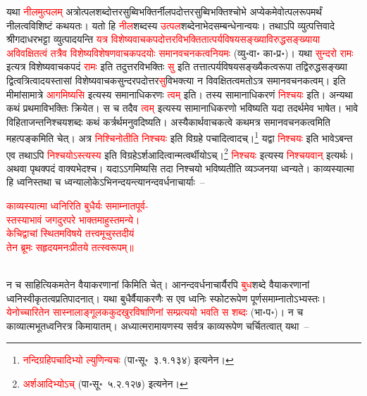 \begin{sloppypar}
यथा \textcolor{red}{नीलमुत्पलम्} अत्रोत्पल\-शब्दोत्तर\-सुब्विभक्तिर्नील\-पदोत्तर\-सुब्विभक्तिश्चोभे अप्येकमेवोत्पल\-रूपमर्थं नीलत्व\-विशिष्टं कथयतः। यतो हि \textcolor{red}{नील}\-शब्दस्य \textcolor{red}{उत्पल}\-शब्देनाभेद\-सम्बन्धेनान्वयः। तथाऽपि व्युत्पत्तिवादे श्रीगदाधरभट्टा व्युत्पादयन्ति \textcolor{red}{यत्र विशेष्य\-वाचक\-पदोत्तर\-विभक्ति\-तात्पर्य\-विषय\-सङ्ख्या\-विरुद्ध\-सङ्ख्याया अविवक्षितत्वं तत्रैव विशेष्य\-विशेषण\-वाचक\-पदयोः समान\-वचनकत्व\-नियमः} (व्यु॰वा॰ का॰प्र॰)। यथा \textcolor{red}{सुन्दरो रामः} इत्यत्र विशेष्य\-वाचक\-पदं \textcolor{red}{रामः} इति तदुत्तर\-विभक्तिः \textcolor{red}{सु} इति तत्तात्पर्य\-विषय\-सङ्ख्यैकत्व\-रूपा तद्विरुद्ध\-सङ्ख्या द्वित्व\-त्रित्वादयस्तासां विशेष्य\-वाचक\-सुन्दर\-पदोत्तर\-\textcolor{red}{सु}\-विभक्त्या न विवक्षितत्वमतोऽत्र समान\-वचनकत्वम्। इति मीमांसा\-मात्रे \textcolor{red}{आगमिष्यसि} इत्यस्य समानाधिकरणः \textcolor{red}{त्वम्} इति। तस्य सामानाधिकरणं \textcolor{red}{निश्चयः} इति। अन्यथा कथं प्रथमा\-विभक्तिः क्रियेत। स च तदैव \textcolor{red}{त्वम्} इत्यस्य सामानाधिकरणो भविष्यति यदा तदर्थमेव भाषेत। भावे विहिताजन्त\-निश्चय\-शब्दः कथं कर्त्रर्थमनुवदिष्यति। अस्यैकार्थ\-वाचकत्वे कथमत्र समान\-वचनकत्वमिति महत्पङ्कमिति चेत्। अत्र \textcolor{red}{निश्चिनोतीति निश्चयः} इति विग्रहे पचादित्वादच्।\footnote{\textcolor{red}{नन्दि\-ग्रहि\-पचादिभ्यो ल्युणिन्यचः} (पा॰सू॰~३.१.१३४) इत्यनेन।} यद्वा \textcolor{red}{निश्चयः} इति भावेऽबन्त एव तथाऽपि \textcolor{red}{निश्चयोऽस्त्यस्य} इति विग्रहेऽर्श\-आदित्वान्मत्वर्थीयोऽच्।\footnote{\textcolor{red}{अर्शआदिभ्योऽच्} (पा॰सू॰~५.२.१२७) इत्यनेन।} \textcolor{red}{निश्चयः} इत्यस्य \textcolor{red}{निश्चयवान्} इत्यर्थः। अथवा पृथक्पदं वाक्यभेदश्च। यदाऽऽगमिष्यसि तदा निश्चयो भविष्यतीति व्यञ्जनया ध्वन्यते। काव्यस्यात्मा हि ध्वनिस्तथा च ध्वन्यालोकेऽभिनन्दयन्त्यानन्द\-वर्धनाचार्याः~–\end{sloppypar}
\centering\textcolor{red}{काव्यस्यात्मा ध्वनिरिति बुधैर्यः समाम्नातपूर्व-\nopagebreak\\
स्तस्याभावं जगदुरपरे भाक्तमाहुस्तमन्ये।\nopagebreak\\
केचिद्वाचां स्थितमविषये तत्त्वमूचुस्तदीयं\nopagebreak\\
तेन ब्रूमः सहृदयमनःप्रीतये तत्स्वरूपम्॥}\nopagebreak\\
\\
\begin{sloppypar}\justifying\noindent न च साहित्यिक\-मतेन वैयाकरणानां किमिति चेत्। आनन्दवर्धनाचार्यैरपि \textcolor{red}{बुध}\-शब्दे वैयाकरणानां ध्वनि\-स्वीकृतत्व\-प्रतिपादनात्। यथा बुधैर्वैयाकरणैः स एव ध्वनिः स्फोट\-रूपेण पूर्ण\-समाम्नातोऽभ्यस्तः। \textcolor{red}{येनोच्चारितेन सास्ना\-लाङ्गूल\-ककुद\-खुर\-विषाणिनां सम्प्रत्ययो भवति स शब्दः} (भा॰प॰)। न च काव्यात्मभूत\-ध्वनिरत्र किमायातम्। अध्यात्म\-रामायणस्य सर्वत्र काव्य\-रूपेण चर्चितत्वात् यथा~–\end{sloppypar}
